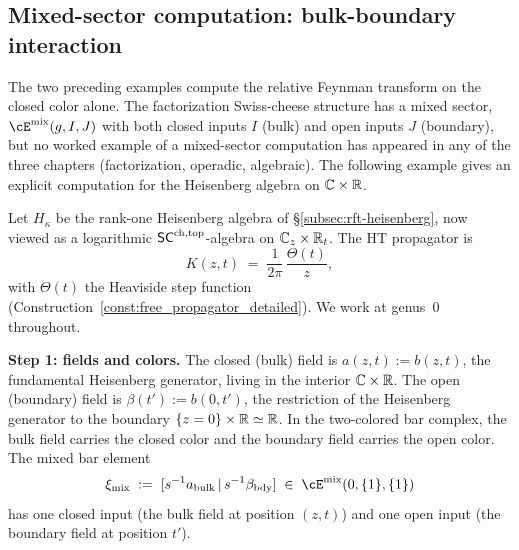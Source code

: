\subsection{Mixed-sector computation: bulk-boundary interaction}
\label{subsec:rft-mixed-sector}

The two preceding examples compute the relative Feynman
transform on the closed color alone. The factorization
Swiss-cheese structure has a mixed sector,
$\cE^{\mathrm{mix}}(g, I, J)$ with both closed inputs $I$
(bulk) and open inputs $J$ (boundary), but no worked
example of a mixed-sector computation has appeared in any of
the three chapters (factorization, operadic, algebraic). The
following example gives an explicit computation for the
Heisenberg algebra on $\mathbb{C} \times \mathbb{R}$.

\begin{example}
\label{ex:rft-mixed-sector}
Let $H_\kappa$ be the rank-one Heisenberg algebra of
\S\ref{subsec:rft-heisenberg}, now viewed as a logarithmic
$\mathsf{SC}^{\mathrm{ch,top}}$-algebra on $\mathbb{C}_z \times \mathbb{R}_t$. The HT propagator is
\begin{equation}\label{eq:mixed-propagator}
K(z,t) \;=\; \frac{1}{2\pi}\,\frac{\Theta(t)}{z},
\end{equation}
with $\Theta(t)$ the Heaviside step function
(Construction~\ref{const:free_propagator_detailed}). We work
at genus~$0$ throughout.

\smallskip\noindent
\textbf{Step 1: fields and colors.}
The closed (bulk) field is $a(z,t) := b(z,t)$, the fundamental
Heisenberg generator, living in the interior
$\mathbb{C} \times \mathbb{R}$.
The open (boundary) field is $\beta(t') := b(0,t')$, the
restriction of the Heisenberg generator to the boundary
$\{z = 0\} \times \mathbb{R} \simeq \mathbb{R}$. In the two-colored bar
complex, the bulk field carries the closed color and the boundary
field carries the open color. The mixed bar element
\[
\xi_{\mathrm{mix}}
\;:=\;
[s^{-1}a_{\mathrm{bulk}} \,|\, s^{-1}\beta_{\mathrm{bdy}}]
\;\in\;
\cE^{\mathrm{mix}}(0, \{1\}, \{1\})
\]
has one closed input (the bulk field at position $(z,t)$) and
one open input (the boundary field at position $t'$).


\end{example}
